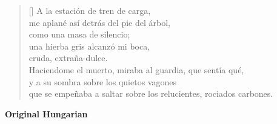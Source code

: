 \documentclass[a4paper,12pt,twoside,final]{book}
\begin{document}

\settowidth{\versewidth}{que se empeñaba a saltar sobre los relucientes, rociados carbones.}

\begin{verse}[\versewidth]
  A la estación de tren de carga, \\
  me aplané así detrás del pie del árbol, \\
  como una masa de silencio; \\
  una hierba gris alcanzó mi boca, \\
  cruda, extraña-dulce. \\
  Haciendome el muerto, miraba al guardia, que sentía qué, \\
  y a su sombra sobre los quietos vagones \\
  que se empeñaba a saltar sobre los relucientes, rociados carbones. \\
\end{verse}

\newpage


\noindent \textbf{Original Hungarian}



\settowidth{\versewidth}{Csak ami nincs, annak van bokra,}
\end{document}
